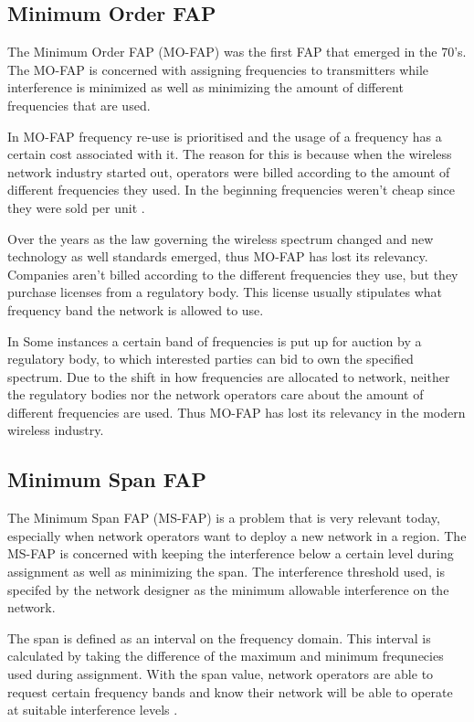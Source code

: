 \subsection{Minimum Order FAP}
The Minimum Order FAP (MO-FAP) was the first FAP that emerged in the 70's. The MO-FAP is concerned with assigning frequencies to transmitters while interference is minimized as well as minimizing the amount of different frequencies that are used. 

In MO-FAP frequency re-use is prioritised and the usage of a frequency has a certain cost associated with it. The reason for this is because when the wireless network industry started out, operators were billed according to the amount of different frequencies they used. In the beginning frequencies weren't cheap since they were sold per unit \cite{Karen2004,MontemanniThesis}. 

Over the years as the law governing the wireless spectrum changed and new technology as well standards emerged, thus MO-FAP has lost its relevancy. Companies aren't billed according to the different frequencies they use, but they purchase licenses from a regulatory body. This license usually stipulates what frequency band the network is allowed to use.

In Some instances a certain band of frequencies is put up for auction by a regulatory body, to which interested parties can bid to own the specified spectrum. Due to the shift in how frequencies are allocated to network, neither the regulatory bodies nor the network operators care about the amount of different frequencies are used. Thus MO-FAP has lost its relevancy in the modern wireless industry.
\subsection{Minimum Span FAP}
The Minimum Span FAP (MS-FAP) is a problem that is very relevant today, especially when network operators want to deploy a new network in a region. The MS-FAP is concerned with keeping the interference below a certain level during assignment as well as minimizing the span. The interference threshold used, is specifed by the network designer as the minimum allowable interference on the network.

The span is defined as an interval on the frequency domain. This interval is calculated by taking the difference of the maximum and minimum frequnecies used during assignment. With the span value, network operators are able to request certain frequency bands and know their network will be able to operate at suitable interference levels \cite{Karen2004,MontemanniThesis,MSFAP}.

